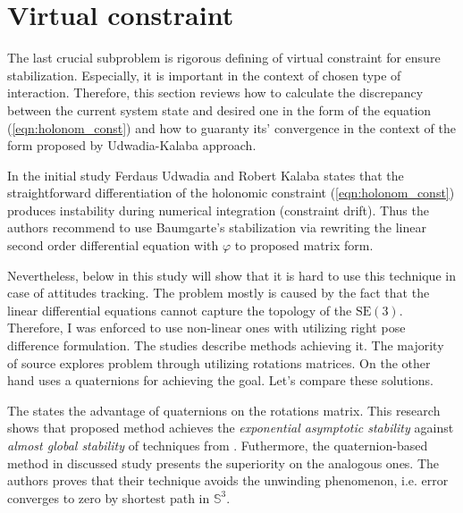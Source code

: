 \section{Virtual constraint} \label{sec:virtual_constraint}

The last crucial subproblem is rigorous defining of virtual constraint for ensure 
stabilization. Especially, it is important in the context of chosen type of 
interaction. Therefore, this section reviews how to calculate the discrepancy 
between the current system state and desired one in the form of the equation 
(\ref{eqn:holonom_const}) and how to guaranty its' convergence in the 
context of the form proposed by Udwadia-Kalaba approach.

In the initial \cite{UdwadiaKalabaApproach} study Ferdaus Udwadia and Robert 
Kalaba states that the straightforward differentiation of the holonomic 
constraint (\ref{eqn:holonom_const}) produces instability during numerical 
integration (constraint drift). Thus the authors recommend to use 
Baumgarte's stabilization \cite{BaumgarteStab} via rewriting the linear second 
order differential equation with $\varphi$ to proposed matrix form.

Nevertheless, below in this study will show that it is hard to use 
this technique in case of attitudes tracking. The problem mostly 
is caused by the fact that the linear differential equations cannot 
capture the topology of the $\text{SE}(3)$. Therefore, I was enforced 
to use non-linear ones with utilizing right pose difference formulation. 
The studies \cite{SlidingOnManifoldsQuat,GeomControlQuadSE3,
RigidBodyAttCon,OutFeedbackStabForOrbRob,ANonlinearObserverUsingPose} 
describe methods achieving it. The majority \cite{GeomControlQuadSE3,
RigidBodyAttCon,OutFeedbackStabForOrbRob,ANonlinearObserverUsingPose} of 
source explores problem through utilizing rotations matrices. On the other hand 
\cite{SlidingOnManifoldsQuat} uses a quaternions for achieving the goal. 
Let's compare these solutions.

The \cite{SlidingOnManifoldsQuat} states the advantage of quaternions on 
the rotations matrix. This research shows that proposed method achieves 
the \emph{exponential asymptotic stability} against \emph{almost global 
stability} of techniques from \cite{GeomControlQuadSE3,RigidBodyAttCon}.
Futhermore, the quaternion-based method in discussed study presents the 
superiority on the analogous ones. The authors proves that their technique 
avoids the unwinding phenomenon, i.e. error converges to zero by shortest 
path in $\mathbb{S}^3$.

